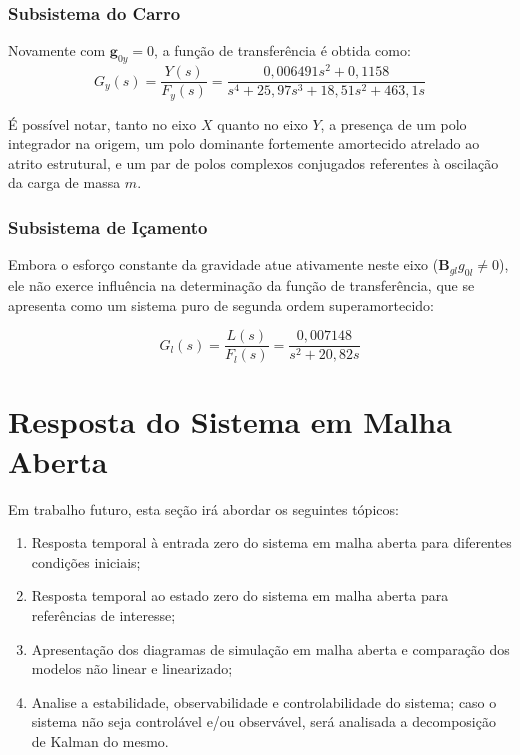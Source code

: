 \documentclass{ppgeesa}
\begin{document}
\subsubsection{Subsistema do Carro}

Novamente com $\mathbf{g}_{0y} = 0$, a função de transferência é obtida como:
\begin{equation}
    G_y(s) = \frac{Y(s)}{F_y(s)} = \frac{0{,}006491 s^2 + 0{,}1158}{s^4 + 25{,}97 s^3 + 18{,}51 s^2 + 463{,}1 s}
\end{equation}

É possível notar, tanto no eixo $X$ quanto no eixo $Y$, a presença de um polo integrador na origem, um polo dominante fortemente amortecido atrelado ao atrito estrutural, e um par de polos complexos conjugados referentes à oscilação da carga de massa $m$.

\subsubsection{Subsistema de Içamento}

Embora o esforço constante da gravidade atue ativamente neste eixo ($\mathbf{B}_{gl}g_{0l} \neq 0$), ele não exerce influência na determinação da função de transferência, que se apresenta como um sistema puro de segunda ordem superamortecido:

\begin{equation}
    G_l(s) = \frac{L(s)}{F_l(s)} = \frac{0{,}007148}{s^2 + 20{,}82 s}
\end{equation}

\section{Resposta do Sistema em Malha Aberta}

Em trabalho futuro, esta seção irá abordar os seguintes tópicos:

\begin{enumerate}
  \item Resposta temporal à entrada zero do sistema em malha aberta para diferentes condições iniciais;
  \item Resposta temporal ao estado zero do sistema em malha aberta para referências de interesse;
  \item Apresentação dos diagramas de simulação em malha aberta e comparação dos modelos não linear e linearizado;
  \item Analise a estabilidade, observabilidade e controlabilidade do sistema; caso o sistema não seja controlável e/ou observável, será analisada a decomposição de Kalman do mesmo.
\end{enumerate}
\end{document}
